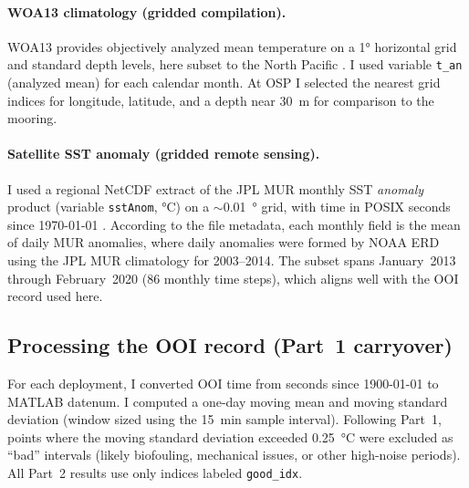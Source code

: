 \documentclass[11pt,letterpaper]{article}
\newcommand{\degC}{\si{\degreeCelsius}}
\begin{document}
\paragraph{WOA13 climatology (gridded compilation).}
WOA13 provides objectively analyzed mean temperature on a \ang{1} horizontal grid and standard depth levels, here subset to the North Pacific \cite{locarnini2013}. I used variable \texttt{t\_an} (analyzed mean) for each calendar month. At OSP I selected the nearest grid indices for longitude, latitude, and a depth near \SI{30}{\meter} for comparison to the mooring.

\paragraph{Satellite SST anomaly (gridded remote sensing).}
I used a regional NetCDF extract of the JPL MUR monthly SST \emph{anomaly} product (variable \texttt{sstAnom}, \degC{}) on a $\sim$\SI{0.01}{\degree} grid, with time in POSIX seconds since 1970-01-01 \cite{chin2017}. According to the file metadata, each monthly field is the mean of daily MUR anomalies, where daily anomalies were formed by NOAA ERD using the JPL MUR climatology for 2003--2014. The subset spans January~2013 through February~2020 (86 monthly time steps), which aligns well with the OOI record used here.

\subsection{Processing the OOI record (Part~1 carryover)}
For each deployment, I converted OOI time from seconds since 1900-01-01 to MATLAB datenum. I computed a one-day moving mean and moving standard deviation (window sized using the \SI{15}{\minute} sample interval). Following Part~1, points where the moving standard deviation exceeded \SI{0.25}{\degreeCelsius} were excluded as ``bad'' intervals (likely biofouling, mechanical issues, or other high-noise periods). All Part~2 results use only indices labeled \texttt{good\_idx}.
\end{document}
